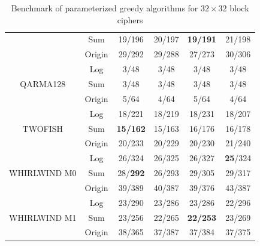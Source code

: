 \begin{table}[H]
{\begin{tabular}{ c c c c c c }
         & Sum & 19/196 & 20/197 & {\color{red}\textbf{19/191}} & 21/198 \\
         & Origin & 29/292 & 29/288 & 27/273 & 30/306 \\
         \hline
         \multirow{3}{4em}{QARMA128\cite{avanzi2017qarma}} & Log &  3/48 & 3/48 & 3/48 & 3/48 \\
         & Sum & 3/48 & 3/48 & 3/48 & 3/48 \\
         & Origin & 5/64 & 4/64 & 5/64 & 4/64 \\
         \hline
         \multirow{3}{4em}{TWOFISH\cite{schneier1998twofish}} & Log &  18/221 & 18/219 & 18/231 & 18/207 \\
         & Sum & {\color{red}\textbf{15/162}} & 15/163 & 16/176 & 16/178 \\
         & Origin & 20/233 & 20/229 &  20/230 & 21/240 \\
         \hline
         \multirow{3}{4em}{WHIRLWIND M0\cite{barreto2010whirlwind}} & Log &  26/324 & 26/325 & 26/327 & {\color{red}\textbf{25}}/324 \\
         & Sum & 28/{\color{red}\textbf{292}} & 26/293 & 29/305 & 29/317 \\
         & Origin & 39/389 & 40/387 & 39/376 & 43/387 \\
         \hline
         \multirow{3}{4em}{WHIRLWIND M1\cite{barreto2010whirlwind}} & Log &  23/290 & 23/286 & 23/286 & 22/296 \\
         & Sum & 23/256 & 22/265 & {\color{red}\textbf{22/253}} & 23/269 \\
         & Origin & 38/365 & 37/387 & 37/384 & 37/375 \\
        \hline
    \end{tabular}}
    \caption{Benchmark of parameterized greedy algorithms for $32\times32$ block ciphers}
    \label{tab:greedy-algorithm-against-32-block}
    \end{table}

